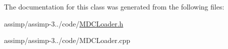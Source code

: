 The documentation for this class was generated from the following files\+:\begin{DoxyCompactItemize}
\item 
assimp/assimp-\/3../code/\hyperlink{_m_d_c_loader_8h}{M\+D\+C\+Loader.\+h}\item 
assimp/assimp-\/3../code/M\+D\+C\+Loader.\+cpp\end{DoxyCompactItemize}

